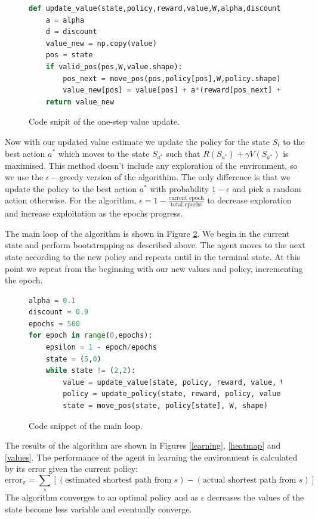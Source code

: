 \documentclass[10pt, a4paper]{article}
\begin{document}
\begin{figure}[H]

\begin{lstlisting}[language=Python]
def update_value(state,policy,reward,value,W,alpha,discount):
    a = alpha
    d = discount
    value_new = np.copy(value)
    pos = state
    if valid_pos(pos,W,value.shape):
        pos_next = move_pos(pos,policy[pos],W,policy.shape)
        value_new[pos] = value[pos] + a*(reward[pos_next] + d*value[pos_next] - value[pos])
    return value_new
\end{lstlisting}
\caption{Code snipit of the one-step value update.}
\label{code:update_value}
\end{figure}


Now with our updated value estimate we update the policy for the state $S_t$ to the best action $a^\ast$  which moves to the state $S_{a^\ast}$ such that $R(S_{a^\ast}) + \gamma V(S_{a^\ast})$ is maximised. This method doesn't include any exploration of the environment, so we use the $\epsilon-$greedy version of the algorithim. The only difference is that we update the policy to the best action $a^\ast$ with probability $1-\epsilon$ and pick a random action otherwise. For the algorithm, $\epsilon = 1 - \frac{\textrm{current epoch}}{\textrm{total epochs}}$ to decrease exploration and increase exploitation as the epochs progress.

The main loop of the algorithm is shown in Figure \ref{code:main_loop}. We begin in the current state and perform bootstrapping as described above. The agent moves to the next state according to the new policy and repeats until in the terminal state. At this point we repeat from the beginning with our new values and policy, incrementing the epoch.

\begin{figure}[H]
	\begin{lstlisting}[language=Python]
alpha = 0.1
discount = 0.9
epochs = 500
for epoch in range(0,epochs):
    epsilon = 1 - epoch/epochs
    state = (5,0)
    while state != (2,2):
        value = update_value(state, policy, reward, value, W, alpha, discount)
        policy = update_policy(state, reward, policy, value, W, discount, epoch, epochs, epsilon)
        state = move_pos(state, policy[state], W, shape)
	\end{lstlisting}
	\caption{Code snippet of the main loop.}
	\label{code:main_loop}
\end{figure}

The results of the algorithm are shown in Figures \ref{learning}, \ref{heatmap} and \ref{values}. The performance of the agent in learning the environment is calculated by its error given the current policy:
\begin{equation}
	\textrm{error}_\pi = \sum_s [(\textrm{estimated shortest path from }s) - (\textrm{actual shortest path from }s)]
\end{equation}
The algorithm converges to an optimal policy and as $\epsilon$ decreases the values of the state become less variable and eventually converge.
\end{document}
